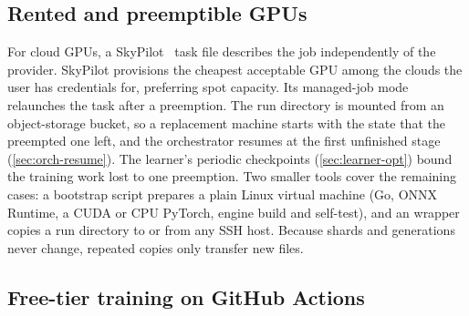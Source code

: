 \subsection{Rented and preemptible GPUs}
\label{sec:infra-cloud}

For cloud GPUs, a SkyPilot~\citep{yang2023skypilot} task file describes the job
independently of the provider. SkyPilot provisions the cheapest acceptable GPU among the
clouds the user has credentials for, preferring spot capacity. Its managed-job mode
relaunches the task after a preemption. The run directory is mounted from an object-storage
bucket, so a replacement machine starts with the state that the preempted one left, and
the orchestrator resumes at the first unfinished stage (\cref{sec:orch-resume}). The
learner's periodic checkpoints (\cref{sec:learner-opt}) bound the training work lost to one
preemption. Two smaller tools cover the remaining cases: a bootstrap script prepares a
plain Linux virtual machine (Go, ONNX Runtime, a CUDA or CPU PyTorch, engine build and
self-test), and an  wrapper copies a run directory to or from any SSH host.
Because shards and generations never change, repeated copies only transfer new files.

\subsection{Free-tier training on GitHub Actions}
\label{sec:infra-actions}

